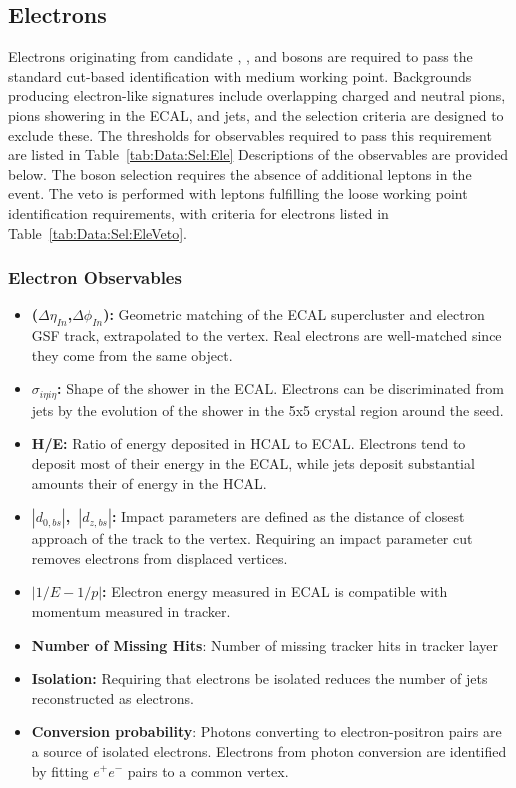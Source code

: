 \subsection{Electrons}\label{ch:IdIso:Ele}

Electrons originating from candidate \Wp, \Wm, and \Z bosons are required to pass the standard cut-based identification with medium working point. Backgrounds producing electron-like signatures include overlapping charged and neutral pions, pions showering in the ECAL, and jets, and the selection criteria are designed to exclude these. The thresholds for observables required to pass this requirement are listed in Table~\ref{tab:Data:Sel:Ele} Descriptions of the observables are provided below. The \Wpm boson selection requires the absence of additional leptons in the event. The veto is performed with leptons fulfilling the loose working point identification requirements, with criteria for electrons listed in Table~\ref{tab:Data:Sel:EleVeto}. 
\subsubsection{Electron Observables}
\begin{itemize}
    \item \textbf{($\Delta\eta_{In}$,$\Delta\phi_{In}$):} Geometric matching of the ECAL supercluster and electron GSF track, extrapolated to the vertex. Real electrons are well-matched since they come from the same object. 
    \item \textbf{$\sigma_{i\eta i\eta}$:} Shape of the shower in the ECAL. Electrons can be discriminated from jets by the evolution of the shower in the 5x5 crystal region around the seed.
    \item \textbf{H/E:} Ratio of energy deposited in HCAL to ECAL. Electrons tend to deposit most of their energy in the ECAL, while jets deposit substantial amounts their of energy in the HCAL.
    \item \textbf{$|d_{0,bs}|$,~$|d_{z,bs}|$:} Impact parameters are defined as the distance of closest approach of the track to the vertex. Requiring an impact parameter cut removes electrons from displaced vertices.
    \item \textbf{$|1/E-1/p|$:} Electron energy measured in ECAL is compatible with momentum measured in tracker.
    \item \textbf{Number of Missing Hits}: Number of missing tracker hits in tracker layer
    \item \textbf{Isolation:} Requiring that electrons be isolated reduces the number of jets reconstructed as electrons.
    \item \textbf{Conversion probability}: Photons converting to electron-positron pairs are a source of isolated electrons. Electrons from photon conversion are identified by fitting $e^+e^-$ pairs to a common vertex.
\end{itemize}

